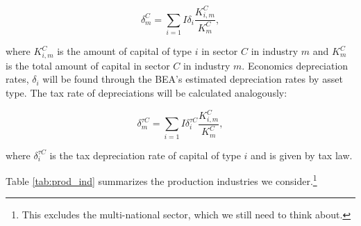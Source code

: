 \documentclass[article,11pt,letterpaper,fleqn]{article}
\theoremstyle{definition}
\numberwithin{equation}{section}
\begin{document}
\begin{equation}
\label{eqn:econ_deprec}
\delta^{C}_{m}=\sum_{i=1}{I}\delta_{i}\frac{K^{C}_{i,m}}{K^{C}_{m}},
\end{equation}

\noindent\noindent where $K^{C}_{i,m}$ is the amount of capital of type $i$ in sector $C$ in industry $m$ and $K^{C}_{m}$ is the total amount of capital in sector $C$ in industry $m$.  Economics depreciation rates, $\delta_{i}$ will be found through the BEA's estimated depreciation rates by asset type.  The tax rate of depreciations will be calculated analogously: 

\begin{equation}
\label{eqn:tax_deprec}
\delta^{\tau C}_{m}=\sum_{i=1}{I}\delta^{\tau C}_{i}\frac{K^{C}_{i,m}}{K^{C}_{m}},
\end{equation}

\noindent\noindent where $\delta^{\tau C}_{i}$ is the tax depreciation rate  of capital of type $i$ and is given by tax law.

Table \ref{tab:prod_ind} summarizes the production industries we consider.\footnote{This excludes the multi-national sector, which we still need to think about.}
\end{document}
